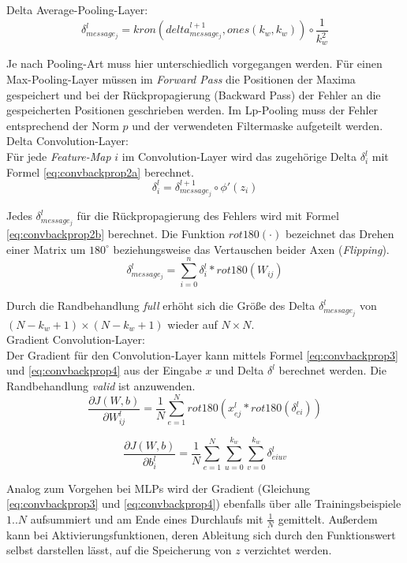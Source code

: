 Delta Average-Pooling-Layer: \\
\begin{equation}
\label{eq:convbackprop1} 
\delta_{message_j}^{l} = kron(delta_{message_j}^{l+1}, ones(k_w,k_w)) \circ \frac{1}{k_w^2} 
\end{equation}

Je nach Pooling-Art muss hier unterschiedlich vorgegangen werden. Für einen Max-Pooling-Layer müssen im \textit{Forward Pass} die Positionen der Maxima gespeichert und bei der Rückpropagierung (Backward Pass) der Fehler an die gespeicherten Positionen geschrieben werden. Im Lp-Pooling muss der Fehler entsprechend der Norm $p$ und der verwendeten Filtermaske aufgeteilt werden.\\

Delta Convolution-Layer: \\
Für jede \textit{Feature-Map} $i$ im Convolution-Layer wird das zugehörige Delta $\delta_i^{l}$ mit Formel \ref{eq:convbackprop2a} berechnet. 
\begin{equation}
\label{eq:convbackprop2a} 
\delta_{i}^{l} =  \delta_{message_j}^{l+1} \circ \phi'(z_{i})
\end{equation}

Jedes $\delta_{message_j}^{l}$ für die Rückpropagierung des Fehlers wird mit Formel \ref{eq:convbackprop2b} berechnet.
Die Funktion $rot180(\cdot)$ bezeichnet das Drehen einer Matrix um $180^\circ$ beziehungsweise das Vertauschen beider Axen (\textit{Flipping}).
\begin{equation}
\label{eq:convbackprop2b} 
\delta_{message_j}^{l} = \sum_{i=0}^{n} \delta_{i}^{l} \ast rot180(W_{ij})
\end{equation}

Durch die Randbehandlung \textit{full} erhöht sich die Größe des Delta $\delta_{message_j}^l$ von $(N - k_w + 1) \times (N - k_w + 1)$ wieder auf  $N \times N$. \\


Gradient Convolution-Layer: \\
Der Gradient für den Convolution-Layer kann mittels Formel \ref{eq:convbackprop3} und \ref{eq:convbackprop4} aus der Eingabe $x$ und Delta $\delta^l$ berechnet werden. Die Randbehandlung \textit{valid} ist anzuwenden.
\begin{equation}
\label{eq:convbackprop3} 
\frac{\partial J(W,b)}{\partial W_{ij}^l} = \frac{1}{N} \sum_{e=1}^{N} rot180(x_{ej}^l \ast rot180(\delta_{ei}^l))                             
\end{equation}

\begin{equation}
\label{eq:convbackprop4}  
\frac{\partial J(W,b)}{\partial b_i^l} = \frac{1}{N} \sum_{e=1}^{N} \sum_{u=0}^{k_w} \sum_{v=0}^{k_w} \delta_{eiuv}^{l} 
\end{equation}

Analog zum Vorgehen bei MLPs wird der Gradient (Gleichung \ref{eq:convbackprop3} und \ref{eq:convbackprop4}) ebenfalls über alle Trainingsbeispiele $1..N$ aufsummiert und am Ende eines Durchlaufs mit $\frac{1}{N}$ gemittelt. Außerdem kann bei Aktivierungsfunktionen, deren Ableitung sich durch den Funktionswert selbst darstellen lässt, auf die Speicherung von $z$ verzichtet werden.

